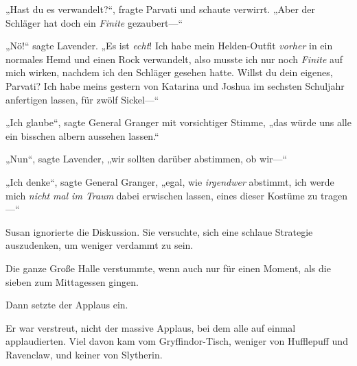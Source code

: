 „Hast du es verwandelt?“, fragte Parvati und schaute verwirrt. „Aber der Schläger hat doch ein \emph{Finite} gezaubert—“

„Nö!“ sagte Lavender. „Es ist \emph{echt}! Ich habe mein Helden-Outfit \emph{vorher} in ein normales Hemd und einen Rock verwandelt, also musste ich nur noch \emph{Finite} auf mich wirken, nachdem ich den Schläger gesehen hatte. Willst du dein eigenes, Parvati? Ich habe meins gestern von Katarina und Joshua im sechsten Schuljahr anfertigen lassen, für zwölf Sickel—“

„Ich glaube“, sagte General Granger mit vorsichtiger Stimme, „das würde uns alle ein bisschen albern aussehen lassen.“

„Nun“, sagte Lavender, „wir sollten darüber abstimmen, ob wir—“

„Ich denke“, sagte General Granger, „egal, wie \emph{irgendwer} abstimmt, ich werde mich \emph{nicht} \emph{mal im Traum} dabei erwischen lassen, eines dieser Kostüme zu tragen—“

Susan ignorierte die Diskussion. Sie versuchte, sich eine schlaue Strategie auszudenken, um weniger verdammt zu sein.

\later

Die ganze Große Halle verstummte, wenn auch nur für einen Moment, als die sieben zum Mittagessen gingen.

Dann setzte der Applaus ein.

Er war verstreut, nicht der massive Applaus, bei dem alle auf einmal applaudierten. Viel davon kam vom Gryffindor-Tisch, weniger von Hufflepuff und Ravenclaw, und keiner von Slytherin.

